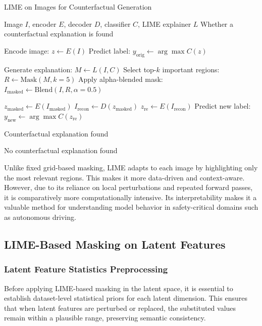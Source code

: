 \vspace{1em}
\begin{algorithm}[H]
\caption{LIME on Images for Counterfactual Generation}
\label{alg:lime_on_images}
\begin{algorithmic}[1]
\REQUIRE Image $I$, encoder $E$, decoder $D$, classifier $C$, LIME explainer $L$
\ENSURE Whether a counterfactual explanation is found

\STATE Encode image: $z \leftarrow E(I)$
\STATE Predict label: $y_{\text{orig}} \leftarrow \arg\max C(z)$

\STATE Generate explanation: $M \leftarrow L(I, C)$
\STATE Select top-$k$ important regions: $R \leftarrow \text{Mask}(M, k=5)$
\STATE Apply alpha-blended mask: $I_{\text{masked}} \leftarrow \text{Blend}(I, R, \alpha=0.5)$

\STATE $z_{\text{masked}} \leftarrow E(I_{\text{masked}})$
\STATE $I_{\text{recon}} \leftarrow D(z_{\text{masked}})$
\STATE $z_{\text{re}} \leftarrow E(I_{\text{recon}})$
\STATE Predict new label: $y_{\text{new}} \leftarrow \arg\max C(z_{\text{re}})$

    \RETURN Counterfactual explanation found
\ENDIF

\RETURN No counterfactual explanation found
\end{algorithmic}
\end{algorithm}
\vspace{1em}

Unlike fixed grid-based masking, LIME adapts to each image by highlighting only the most relevant regions. This makes it more data-driven and context-aware. However, due to its reliance on local perturbations and repeated forward passes, it is comparatively more computationally intensive. Its interpretability makes it a valuable method for understanding model behavior in safety-critical domains such as autonomous driving.



\subsection{LIME-Based Masking on Latent Features} \label{sec:lime_based_masking_on_latent_features}

\subsubsection*{Latent Feature Statistics Preprocessing}
\label{sec:latent_statistics_preprocessing}
Before applying LIME-based masking in the latent space, it is essential to establish dataset-level statistical priors for each latent dimension. This ensures that when latent features are perturbed or replaced, the substituted values remain within a plausible range, preserving semantic consistency.

